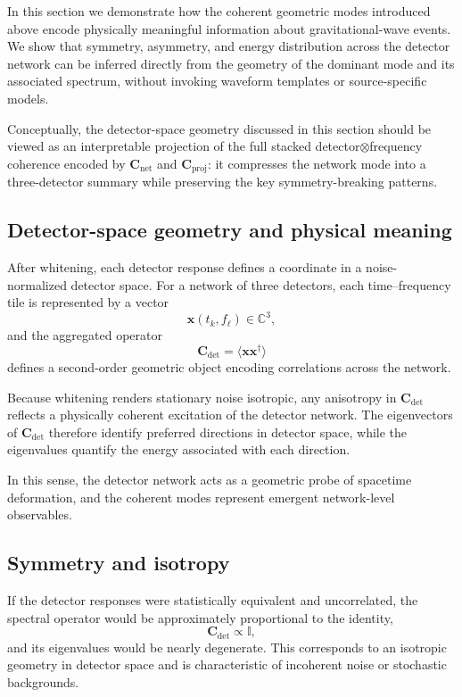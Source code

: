 \documentclass[11pt,a4paper]{article}
\begin{document}
In this section we demonstrate how the coherent geometric modes introduced above encode
physically meaningful information about gravitational-wave events.
We show that symmetry, asymmetry, and energy distribution across the detector network
can be inferred directly from the geometry of the dominant mode and its associated spectrum,
without invoking waveform templates or source-specific models.

Conceptually, the detector-space geometry discussed in this section should be viewed as an interpretable
projection of the full stacked detector$\otimes$frequency coherence encoded by $\mathbf{C}_{\mathrm{net}}$ and
$\mathbf{C}_{\mathrm{proj}}$: it compresses the network mode into a three-detector summary while preserving
the key symmetry-breaking patterns.

\subsection{Detector-space geometry and physical meaning}

After whitening, each detector response defines a coordinate in a noise-normalized detector space.
For a network of three detectors, each time--frequency tile is represented by a vector
\[
\mathbf{x}(t_k,f_\ell) \in \mathbb{C}^3,
\]
and the aggregated operator
\[
\mathbf{C}_{\mathrm{det}} = \langle \mathbf{x}\mathbf{x}^\dagger \rangle
\]
defines a second-order geometric object encoding correlations across the network.

Because whitening renders stationary noise isotropic, any anisotropy in $\mathbf{C}_{\mathrm{det}}$ reflects
a physically coherent excitation of the detector network.
The eigenvectors of $\mathbf{C}_{\mathrm{det}}$ therefore identify preferred directions in detector space,
while the eigenvalues quantify the energy associated with each direction.

In this sense, the detector network acts as a geometric probe of spacetime deformation,
and the coherent modes represent emergent network-level observables.

\subsection{Symmetry and isotropy}

If the detector responses were statistically equivalent and uncorrelated,
the spectral operator would be approximately proportional to the identity,
\[
\mathbf{C}_{\mathrm{det}} \propto \mathbb{I},
\]
and its eigenvalues would be nearly degenerate.
This corresponds to an isotropic geometry in detector space and is characteristic
of incoherent noise or stochastic backgrounds.
\end{document}
